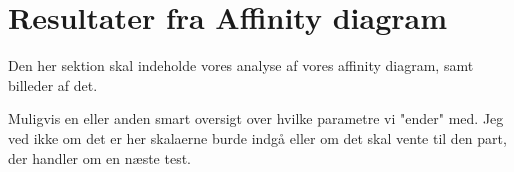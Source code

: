\section{Resultater fra Affinity diagram}
\label{ParametreDatabehandlingAffinityDiagram}
%
Den her sektion skal indeholde vores analyse af vores affinity diagram, samt billeder af det. 

Muligvis en eller anden smart oversigt over hvilke parametre vi "ender" med. Jeg ved ikke om det er her skalaerne burde indgå eller om det skal vente til den part, der handler om en næste test. 